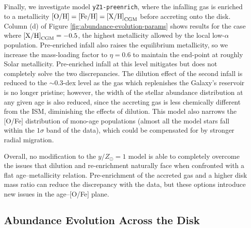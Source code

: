\documentclass[twocolumn,twocolappendix,linenumbers]{aastex631}
\newcommand{\mathOH}{{\rm [O/H]}}
\newcommand{\mathFeH}{{\rm [Fe/H]}}
\newcommand{\yZ}[1]{$y/Z_\odot=#1$}
\begin{document}
Finally, we investigate model {\tt yZ1-preenrich}, where the infalling gas is enriched to a metallicity $\mathOH=\mathFeH={\rm [X/H]}_{\rm CGM}$ before accreting onto the disk. Column (d) of Figure \ref{fig:abundance-evolution-params} shows results for the case where ${\rm [X/H]}_{\rm CGM}=-0.5$, the highest metallicity allowed by the local low-$\alpha$ population. Pre-enriched infall also raises the equilibrium metallicity, so we increase the mass-loading factor to $\eta=0.6$ to maintain the end-point at roughly Solar metallicity. Pre-enriched infall at this level mitigates but does not completely solve the two discrepancies. The dilution effect of the second infall is reduced to the $\sim0.3$-dex level as the gas which replenishes the Galaxy's reservoir is no longer pristine; however, the width of the stellar abundance distribution at any given age is also reduced, since the accreting gas is less chemically different from the ISM, diminishing the effects of dilution. This model also narrows the [O/Fe] distribution of mono-age populations (almost all the model stars fall within the $1\sigma$ band of the data), which could be compensated for by stronger radial migration.

Overall, no modification to the \yZ{1} model is able to completely overcome the issues that dilution and re-enrichment naturally face when confronted with a flat age--metallicity relation. Pre-enrichment of the accreted gas and a higher disk mass ratio can reduce the discrepancy with the data, but these options introduce new issues in the age--[O/Fe] plane. 

\subsection{Abundance Evolution Across the Disk}
\label{sec:disk-evolution}
\end{document}
